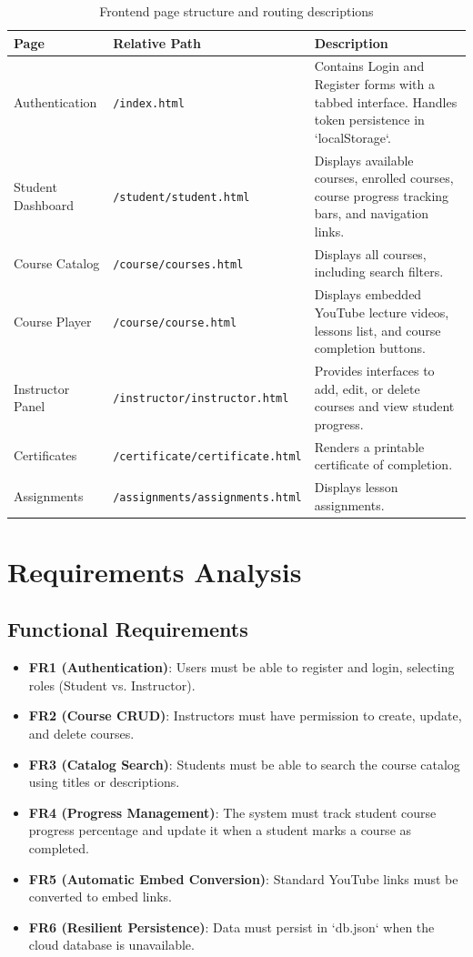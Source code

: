 \documentclass[12pt,a4paper]{report}
\begin{document}
\begin{table}[h!]
\centering
\begin{tabular}{|p{3.5cm}|p{2cm}|p{8.5cm}|}
\hline
\textbf{Page} & \textbf{Relative Path} & \textbf{Description} \\
\hline
Authentication & \texttt{/index.html} & Contains Login and Register forms with a tabbed interface. Handles token persistence in `localStorage`. \\
\hline
Student Dashboard & \texttt{/student/student.html} & Displays available courses, enrolled courses, course progress tracking bars, and navigation links. \\
\hline
Course Catalog & \texttt{/course/courses.html} & Displays all courses, including search filters. \\
\hline
Course Player & \texttt{/course/course.html} & Displays embedded YouTube lecture videos, lessons list, and course completion buttons. \\
\hline
Instructor Panel & \texttt{/instructor/instructor.html} & Provides interfaces to add, edit, or delete courses and view student progress. \\
\hline
Certificates & \texttt{/certificate/certificate.html} & Renders a printable certificate of completion. \\
\hline
Assignments & \texttt{/assignments/assignments.html} & Displays lesson assignments. \\
\hline
\end{tabular}
\caption{Frontend page structure and routing descriptions}
\label{tab:pages}
\end{table}

\section{Requirements Analysis}
\subsection{Functional Requirements}
\begin{itemize}
    \item \textbf{FR1 (Authentication)}: Users must be able to register and login, selecting roles (Student vs. Instructor).
    \item \textbf{FR2 (Course CRUD)}: Instructors must have permission to create, update, and delete courses.
    \item \textbf{FR3 (Catalog Search)}: Students must be able to search the course catalog using titles or descriptions.
    \item \textbf{FR4 (Progress Management)}: The system must track student course progress percentage and update it when a student marks a course as completed.
    \item \textbf{FR5 (Automatic Embed Conversion)}: Standard YouTube links must be converted to embed links.
    \item \textbf{FR6 (Resilient Persistence)}: Data must persist in `db.json` when the cloud database is unavailable.
\end{itemize}
\end{document}
